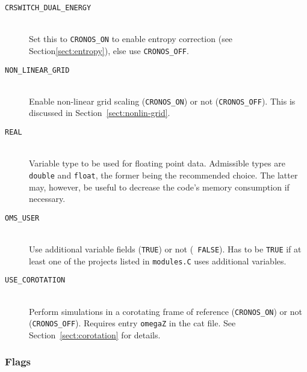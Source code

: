 \begin{description}
\item[{\tt CRSWITCH\_DUAL\_ENERGY}]{\ }\\
  Set this to {\tt CRONOS\_ON} to enable entropy correction (see
  Section\ref{sect:entropy}), else use {\tt CRONOS\_OFF}.
  
\item[{\tt NON\_LINEAR\_GRID}]{\ }\\
  Enable non-linear grid scaling ({\tt CRONOS\_ON}) or not
  ({\tt CRONOS\_OFF}). This is discussed in Section~\ref{sect:nonlin-grid}.
  
\item[{\tt REAL}]{\ }\\ Variable type to be used for floating point
  data. Admissible types are {\tt double} and {\tt float}, the former
  being the recommended choice. The latter may, however, be useful to
  decrease the code's memory consumption if necessary.
  
\item[{\tt OMS\_USER}]{\ }\\
  Use additional variable fields ({\tt TRUE}) or not ({\tt
    FALSE}). Has to be {\tt TRUE} if at least one of the projects
  listed in {\tt modules.C} uses additional variables.
  
\item[{\tt USE\_COROTATION}]{\ }\\  
  Perform simulations in a corotating frame of reference ({\tt CRONOS\_ON})
  or not ({\tt CRONOS\_OFF}). Requires entry {\tt omegaZ} in the cat file.
  See Section~\ref{sect:corotation} for details.
  
\end{description}

\subsubsection{Flags}

